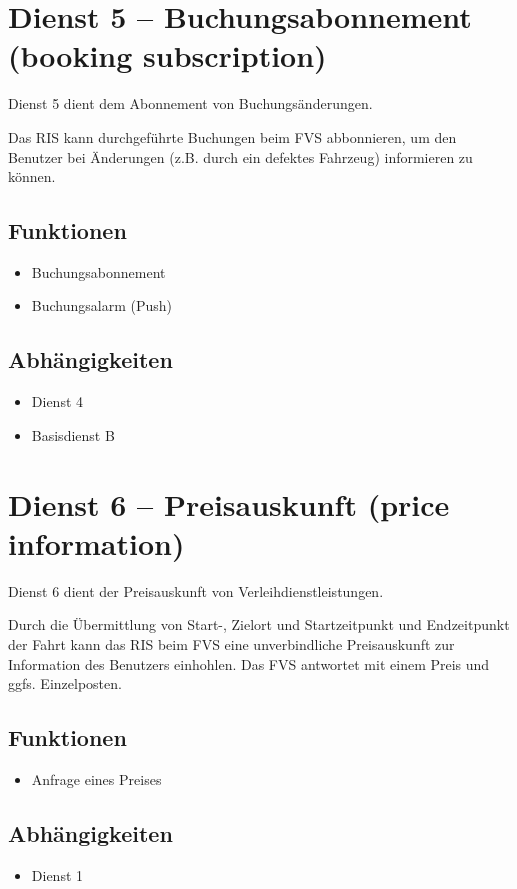 \section{Dienst 5 -- Buchungsabonnement (booking subscription)}
Dienst 5 dient dem Abonnement von Buchungsänderungen.

Das RIS kann durchgeführte Buchungen beim FVS abbonnieren, um den Benutzer bei Änderungen (z.B. durch ein defektes Fahrzeug) informieren zu können.
\subsection*{Funktionen}
\begin{itemize}
\item Buchungsabonnement
\item Buchungsalarm (Push)
\end{itemize}

\subsection*{Abhängigkeiten}
\begin{itemize}
\item Dienst 4
\item Basisdienst B
\end{itemize}

\section{Dienst 6 -- Preisauskunft (price information)}
Dienst 6 dient der Preisauskunft von Verleihdienstleistungen. 

Durch die Übermittlung von Start-, Zielort und Startzeitpunkt und Endzeitpunkt der Fahrt kann das RIS beim FVS eine unverbindliche Preisauskunft zur Information des Benutzers einhohlen. Das FVS antwortet mit einem Preis und ggfs. Einzelposten.

\subsection*{Funktionen}
\begin{itemize}
\item Anfrage eines Preises
\end{itemize}

\subsection*{Abhängigkeiten}
\begin{itemize}
\item Dienst 1
\end{itemize}


